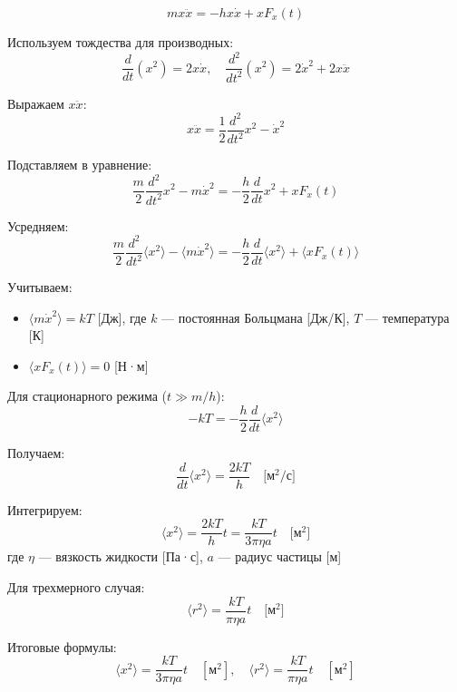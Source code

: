 \[ mx\ddot{x} = -hx\dot{x} + xF_x(t) \]

Используем тождества для производных:
\[ \frac{d}{dt}(x^2) = 2x\dot{x}, \quad \frac{d^2}{dt^2}(x^2) = 2\dot{x}^2 + 2x\ddot{x} \]

Выражаем $x\ddot{x}$:
\[ x\ddot{x} = \frac{1}{2}\frac{d^2}{dt^2}x^2 - \dot{x}^2 \]

Подставляем в уравнение:
\[ \frac{m}{2}\frac{d^2}{dt^2}x^2 - m\dot{x}^2 = -\frac{h}{2}\frac{d}{dt}x^2 + xF_x(t) \]

Усредняем:
\[ \frac{m}{2}\frac{d^2}{dt^2}\langle x^2\rangle - \langle m\dot{x}^2\rangle = -\frac{h}{2}\frac{d}{dt}\langle x^2\rangle + \langle xF_x(t)\rangle \]

Учитываем:
\begin{itemize}
	\item $\langle m\dot{x}^2\rangle = kT$ [Дж], где $k$ — постоянная Больцмана [Дж/К], $T$ — температура [К]
	\item $\langle xF_x(t)\rangle = 0$ [Н·м]
\end{itemize}

Для стационарного режима ($t \gg m/h$):
\[ -kT = -\frac{h}{2}\frac{d}{dt}\langle x^2\rangle \]

Получаем:
\[ \frac{d}{dt}\langle x^2\rangle = \frac{2kT}{h} \quad \text{[м$^2$/с]} \]

Интегрируем:
\[ \langle x^2\rangle = \frac{2kT}{h}t = \frac{kT}{3\pi\eta a}t \quad \text{[м$^2$]} \]
где $\eta$ — вязкость жидкости [Па·с], $a$ — радиус частицы [м]

Для трехмерного случая:
\[ \langle r^2\rangle = \frac{kT}{\pi\eta a}t \quad \text{[м$^2$]} \]

Итоговые формулы:
\[ \boxed{\langle x^2\rangle = \frac{kT}{3\pi\eta a}t \quad [\text{м}^2]}, \quad \boxed{\langle r^2\rangle = \frac{kT}{\pi\eta a}t \quad [\text{м}^2]} \]